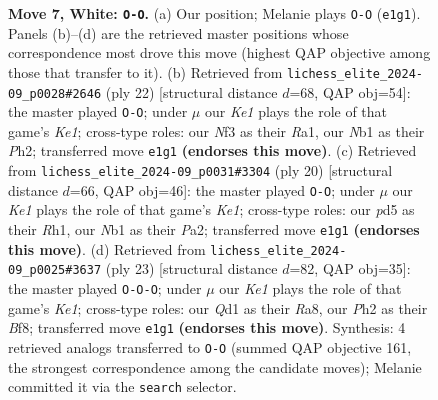 \documentclass[11pt]{article}
\begin{document}
\begin{figure}[p]
\caption{\textbf{Move 7, White: \texttt{O-O}.} (a) Our position; Melanie plays \texttt{O-O} (\texttt{e1g1}). Panels (b)--(d) are the retrieved master positions whose correspondence most drove this move (highest QAP objective among those that transfer to it). (b) Retrieved from \texttt{lichess\_elite\_2024-09\_p0028\#2646} (ply 22) [structural distance $d$=68, QAP obj=54]: the master played \texttt{O-O}; under $\mu$ our \emph{Ke1} plays the role of that game's \emph{Ke1}; cross-type roles: our \emph{N}f3 as their \emph{R}a1, our \emph{N}b1 as their \emph{P}h2; transferred move \texttt{e1g1} \textbf{(endorses this move)}. (c) Retrieved from \texttt{lichess\_elite\_2024-09\_p0031\#3304} (ply 20) [structural distance $d$=66, QAP obj=46]: the master played \texttt{O-O}; under $\mu$ our \emph{Ke1} plays the role of that game's \emph{Ke1}; cross-type roles: our \emph{p}d5 as their \emph{R}h1, our \emph{N}b1 as their \emph{P}a2; transferred move \texttt{e1g1} \textbf{(endorses this move)}. (d) Retrieved from \texttt{lichess\_elite\_2024-09\_p0025\#3637} (ply 23) [structural distance $d$=82, QAP obj=35]: the master played \texttt{O-O-O}; under $\mu$ our \emph{Ke1} plays the role of that game's \emph{Ke1}; cross-type roles: our \emph{Q}d1 as their \emph{R}a8, our \emph{P}h2 as their \emph{B}f8; transferred move \texttt{e1g1} \textbf{(endorses this move)}. Synthesis: 4 retrieved analogs transferred to \texttt{O-O} (summed QAP objective 161, the strongest correspondence among the candidate moves); Melanie committed it via the \texttt{search} selector.}
\label{fig:thought-m12}
\end{figure}

\clearpage
\end{document}
